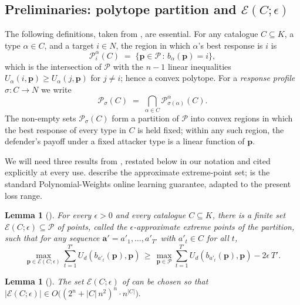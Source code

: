 \documentclass[letterpaper,9pt,twocolumn]{extarticle}
\newcommand{\pvec}{\mathbf{p}}
\newcommand{\avec}{\mathbf{a}}
\newcommand{\cP}{\mathcal{P}}
\newcommand{\cE}{\mathcal{E}}
\theoremstyle{plain}
\newtheorem{lemma}[theorem]{Lemma}
\theoremstyle{definition}
\theoremstyle{remark}
\begin{document}
\subsection{Preliminaries: polytope partition and $\cE(C;\epsilon)$}
\label{sec:polytopes}

The following definitions, taken from \citet[Sec.~4]{balcan2015}, are
essential. For any catalogue $C\subseteq K$, a type $\alpha\in C$, and a
target $i\in N$, the region in which $\alpha$'s best response is $i$ is
\begin{equation}
\cP^\alpha_i(C)\;=\;\{\pvec\in\cP\,:\,b_\alpha(\pvec)=i\},
\label{eq:Pia}
\end{equation}
which is the intersection of $\cP$ with the $n-1$ linear inequalities
$U_\alpha(i,\pvec)\ge U_\alpha(j,\pvec)$ for $j\ne i$; hence a convex
polytope. For a \emph{response profile}
$\sigma:C\to N$ we write
\begin{equation}
\cP_\sigma(C)\;=\;\bigcap_{\alpha\in C}\cP^\alpha_{\sigma(\alpha)}(C).
\label{eq:Psigma}
\end{equation}
The non-empty sets $\cP_\sigma(C)$ form a partition of $\cP$ into convex
regions in which the best response of every type in $C$ is held fixed;
within any such region, the defender's payoff under a fixed attacker type
is a linear function of $\pvec$.

We will need three results from \citet{balcan2015}, restated below in our
notation and cited explicitly at every use.  describe
the approximate extreme-point set;  is the standard
Polynomial-Weights online learning guarantee, adapted to the present loss
range.

\begin{lemma}[{\citealp[Lemma 4.3]{balcan2015}}]
\label{lem:43}
For every $\epsilon>0$ and every catalogue $C\subseteq K$, there is a
finite set $\cE(C;\epsilon)\subseteq \cP$ of points, called the
$\epsilon$-approximate extreme points of the partition, such that for any
sequence $\avec'=a'_1,\dots,a'_{T'}$ with $a'_t\in C$ for all $t$,
\[
\max_{\pvec\in\cE(C;\epsilon)}\!\sum_{t=1}^{T'}\!U_d(b_{a'_t}(\pvec),\pvec)\,\ge\,\max_{\pvec\in\cP}\!\sum_{t=1}^{T'}\!U_d(b_{a'_t}(\pvec),\pvec)-2\epsilon\,T'.
\]
\end{lemma}

\begin{lemma}[{\citealp[Lemma 4.4]{balcan2015}}]
\label{lem:44}
The set $\cE(C;\epsilon)$ of  can be chosen so that
\(|\cE(C;\epsilon)|\in O\!\bigl((2^n+|C|\,n^2)^n\cdot n^{|C|}\bigr).\)
\end{lemma}
\end{document}
